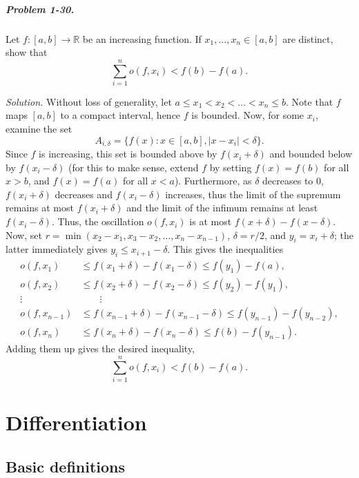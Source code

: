 \documentclass[11pt]{report}
\newcommand{\R}{\mathbb{R}}
\newcommand{\problem}[1]{\paragraph{Problem #1.}}
\newcommand{\solution}{\noindent\textit{Solution.} }
\begin{document}
    \problem{1-30} Let $f\colon [a, b] \to \R$ be an increasing function. If $x_1,
    \dots, x_n \in [a, b]$ are distinct, show that \[
        \sum_{i = 1}^n o(f, x_i) < f(b) - f(a).
    \] 

    \solution Without loss of generality, let $a \leq x_1 < x_2 < \dots < x_n \leq
    b$. Note that $f$ maps $[a, b]$ to a compact interval, hence $f$ is bounded. Now,
    for some $x_i$, examine the set \[
        A_{i, \delta} = \{f(x) : x \in [a, b], |x - x_i| < \delta\}.
    \] Since $f$ is increasing, this set is bounded above by $f(x_i + \delta)$ and
    bounded below by $f(x_i - \delta)$ (for this to make sense, extend $f$ by setting
    $f(x) = f(b)$ for all $x > b$, and $f(x) = f(a)$ for all $x < a$). Furthermore,
    as $\delta$ decreases to $0$, $f(x_i + \delta)$ decreases and $f(x_i - \delta)$
    increases, thus the limit of the supremum remains at most $f(x_i + \delta)$ and
    the limit of the infimum remains at least $f(x_i - \delta)$. Thus, the
    oscillation $o(f, x_i)$ is at most $f(x + \delta) - f(x - \delta)$. Now, set
    $r = \min(x_2 - x_1, x_3 - x_2, \dots, x_n - x_{n - 1})$, $\delta = r / 2$, and
    $y_i = x_i + \delta$; the latter immediately gives $y_i \leq x_{i + 1} - \delta$.
    This gives the inequalities \begin{align*}
        o(f, x_1) &\leq f(x_1 + \delta) - f(x_1 - \delta) \leq f(y_1) - f(a), \\
        o(f, x_2) &\leq f(x_2 + \delta) - f(x_2 - \delta) \leq f(y_2) - f(y_1), \\
        \vdots \quad& \qquad \vdots\\
        o(f, x_{n - 1}) &\leq f(x_{n - 1} + \delta) - f(x_{n - 1} - \delta) \leq
        f(y_{n - 1}) - f(y_{n - 2}), \\
        o(f, x_n) &\leq f(x_n + \delta) - f(x_n - \delta) \leq f(b) - f(y_{n - 1}).
    \end{align*}
    Adding them up gives the desired inequality, \[
        \sum_{i = 1}^n o(f, x_i) < f(b) - f(a).
    \] 





    \chapter{Differentiation}

    \section{Basic definitions}
\end{document}
